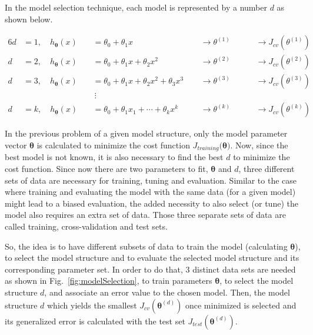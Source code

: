 In the model selection technique, each model is represented by a number $d$ as shown below.

\begin{alignat*}{6}
\label{eqn:exampCostFunc}
d &= 1, \quad h_{{\bm{\theta}}}(x) \ && = \theta_0 + \theta_1 x\ \ && \longrightarrow \theta^{(1)}\ \ && \quad \longrightarrow J_{cv}(\theta^{(1)})\
\\
d &= 2, \quad h_{{\bm{\theta}}}(x) \ && = \theta_0 + \theta_1 x + \theta_2 x^2 \ \ && \longrightarrow \theta^{(2)}\ \ && \quad \longrightarrow J_{cv}(\theta^{(2)})\
\\
d &= 3, \quad h_{{\bm{\theta}}}(x) \ && = \theta_0 + \theta_1 x + \theta_2 x^2 + \theta_3 x^3\ \ && \longrightarrow \theta^{(3)}\ \ && \quad \longrightarrow J_{cv}(\theta^{(3)})\
\\
& \ &&\ \vdots \ &&\ \ &&\ 
\\
d &= k, \quad h_{{\bm{\theta}}}(x) \ && = \theta_0 + \theta_1 x_1 + \cdots+ \theta_k x^k\ \ && \longrightarrow \theta^{(k)}\ \ && \quad \longrightarrow J_{cv}(\theta^{(k)})\
\end{alignat*}

In the previous problem of a given model structure, only the model parameter vector $\bm{\theta}$ is calculated to minimize the cost function $J_{training}(\bm{\theta)}$.
Now, since the best model is not known, it is also necessary to find the best $d$ to minimize the cost function. 
Since now there are two parameters to fit, $\bm{\theta}$ and $d$, three different sets of data are necessary for training, tuning and evaluation.
Similar to the case where training and evaluating the model with the same data (for a given model) might lead to a biased evaluation, the added necessity to also select (or tune) the model also requires an extra set of data. Those three separate sets of data are called training, cross-validation and test sets.

So, the idea is to have different subsets of data to train the model (calculating ${\bm{\theta}}$), to select the model structure and to evaluate the selected model structure and its corresponding parameter set. 
In order to do that, 3 distinct data sets are needed as shown in Fig.~\ref{fig:modelSelection}, to train parameters ${\bm{\theta}}$, to select the model structure $d$, and associate an error value to the chosen model. 
Then, the model structure $d$ which yields the smallest $J_{cv}({\bm{\theta}}^{(d)})$ once minimized is selected and its generalized error is calculated with the test set $J_{test}({\bm{\theta}}^{(d)})$.

